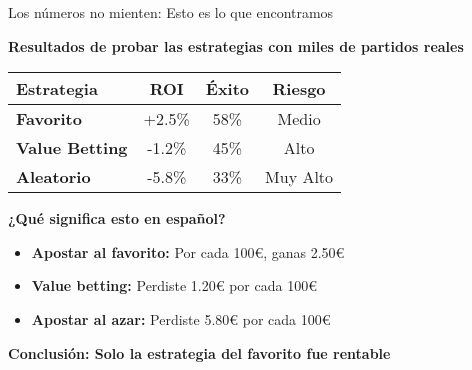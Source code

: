 \documentclass[aspectratio=169]{beamer}
\begin{document}
\begin{frame}{Los números no mienten: Esto es lo que encontramos}
\begin{center}
\Large
\textbf{Resultados de probar las estrategias con miles de partidos reales}
\end{center}

\vspace{0.5cm}

\begin{center}
\begin{tabular}{lccc}
\toprule
\textbf{Estrategia} & \textbf{ROI} & \textbf{Éxito} & \textbf{Riesgo} \\
\midrule
\textcolor{azulprincipal}{\textbf{Favorito}} & +2.5\% & 58\% & Medio \\
\textcolor{verdeganancia}{\textbf{Value Betting}} & -1.2\% & 45\% & Alto \\
\textcolor{rojoperdida}{\textbf{Aleatorio}} & -5.8\% & 33\% & Muy Alto \\
\bottomrule
\end{tabular}
\end{center}

\vspace{0.5cm}

\textbf{¿Qué significa esto en español?}
\begin{itemize}
\item \textcolor{azulprincipal}{\textbf{Apostar al favorito:}} Por cada 100€, ganas 2.50€
\item \textcolor{verdeganancia}{\textbf{Value betting:}} Perdiste 1.20€ por cada 100€
\item \textcolor{rojoperdida}{\textbf{Apostar al azar:}} Perdiste 5.80€ por cada 100€
\end{itemize}

\vspace{0.3cm}
\begin{center}
\textbf{Conclusión: Solo la estrategia del favorito fue rentable}
\end{center}
\end{frame}
\end{document}
